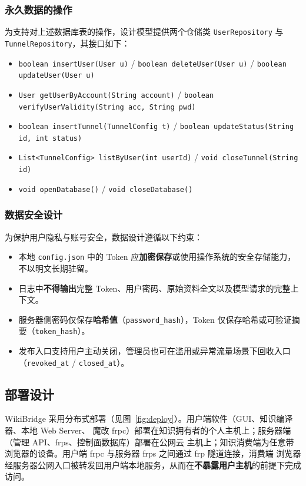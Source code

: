 \documentclass[UTF8,a4paper,12pt]{ctexart}
\newcommand{\keypoint}[1]{\textcolor{whu}{\textbf{#1}}}
\newcommand{\code}[1]{\texttt{#1}}
\begin{document}
\subsubsection{永久数据的操作}
为支持对上述数据库表的操作，设计模型提供两个仓储类 \code{UserRepository} 与
\code{TunnelRepository}，其接口如下：
\begin{itemize}[leftmargin=2.2em, itemsep=1pt]
  \item \code{boolean insertUser(User u)} / \code{boolean deleteUser(User u)} / \code{boolean updateUser(User u)}
  \item \code{User getUserByAccount(String account)} / \code{boolean verifyUserValidity(String acc, String pwd)}
  \item \code{boolean insertTunnel(TunnelConfig t)} / \code{boolean updateStatus(String id, int status)}
  \item \code{List<TunnelConfig> listByUser(int userId)} / \code{void closeTunnel(String id)}
  \item \code{void openDatabase()} / \code{void closeDatabase()}
\end{itemize}

\subsubsection{数据安全设计}
为保护用户隐私与账号安全，数据设计遵循以下约束：
\begin{itemize}[leftmargin=2.2em, itemsep=1pt]
  \item 本地 \code{config.json} 中的 Token 应\keypoint{加密保存}或使用操作系统的安全存储能力，不以明文长期驻留。
  \item 日志中\keypoint{不得输出}完整 Token、用户密码、原始资料全文以及模型请求的完整上下文。
  \item 服务器侧密码仅保存\keypoint{哈希值}（\code{password\_hash}），Token 仅保存哈希或可验证摘要（\code{token\_hash}）。
  \item 发布入口支持用户主动关闭，管理员也可在滥用或异常流量场景下回收入口（\code{revoked\_at} / \code{closed\_at}）。
\end{itemize}

\subsection{部署设计}
WikiBridge 采用分布式部署（见图~\ref{fig:deploy}）。用户端软件（GUI、知识编译器、本地 Web Server、
魔改 frpc）部署在知识拥有者的个人主机上；服务器端（管理 API、frps、控制面数据库）部署在公网云
主机上；知识消费端为任意带浏览器的设备。用户端 frpc 与服务器 frps 之间通过 frp 隧道连接，消费端
浏览器经服务器公网入口被转发回用户端本地服务，从而在\keypoint{不暴露用户主机}的前提下完成访问。
\end{document}
